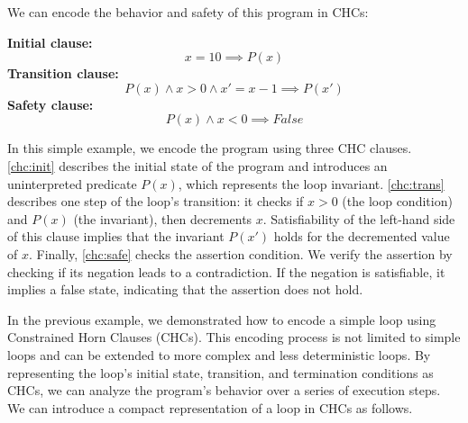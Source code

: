 \noindent We can encode the behavior and safety of this program in CHCs:

\noindent\vspace{\baselineskip}
\textbf{Initial clause:}
\begin{equation}
    x = 10 \implies P(x)
    \label{chc:init}
\end{equation}
\vspace{\baselineskip}
\textbf{Transition clause:}
\begin{equation}
     P(x) \land x > 0 \land x' = x - 1 \implies P(x')
    \label{chc:trans}
\end{equation}
\vspace{\baselineskip}
\textbf{Safety clause:}
\begin{equation}
    P(x) \land x < 0  \implies False
    \label{chc:safe}
\end{equation}

In this simple example, we encode the program using three CHC clauses. \eqref{chc:init} describes the initial state of the program and introduces an
uninterpreted predicate $P(x)$, which represents the loop invariant. \eqref{chc:trans} describes one step of the loop's transition: it checks if $x>0$
(the loop condition) and $P(x)$ (the invariant), then decrements $x$.
Satisfiability of the left-hand side of this clause implies that the invariant
$P(x')$ holds for the decremented value of $x$. Finally, \eqref{chc:safe}
checks the assertion condition. We verify the assertion by checking if its negation
leads to a contradiction. If the negation is satisfiable, it
implies a false state, indicating that the assertion does not hold.

In the previous example, we demonstrated how to encode a simple loop using
Constrained Horn Clauses (CHCs). This encoding process is not limited to simple
loops and can be extended to more complex and less deterministic loops. By
representing the loop’s initial state, transition, and termination conditions
as CHCs, we can analyze the program's behavior over a series of execution
steps. We can introduce a compact representation of a loop in CHCs as follows.

